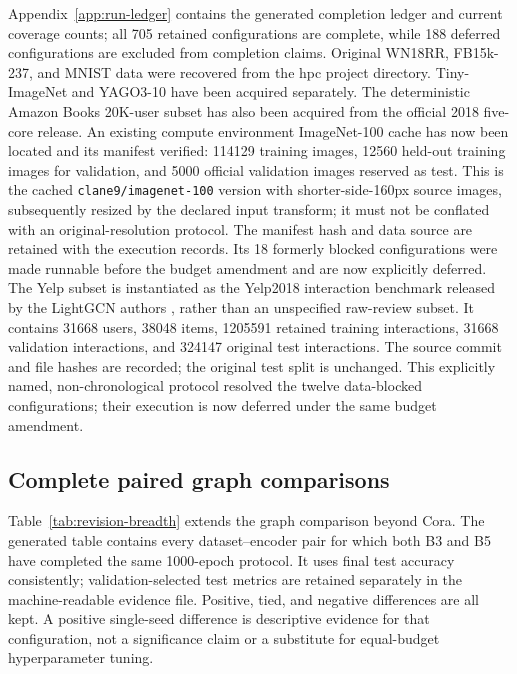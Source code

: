 Appendix~\ref{app:run-ledger} contains the generated completion ledger and current coverage counts; all 705 retained configurations are complete, while 188 deferred configurations are excluded from completion claims. Original WN18RR, FB15k-237, and MNIST data were recovered from the hpc project directory. Tiny-ImageNet and YAGO3-10 have been acquired separately. The deterministic Amazon Books 20K-user subset has also been acquired from the official 2018 five-core release. An existing compute environment ImageNet-100 cache has now been located and its manifest verified: 114129 training images, 12560 held-out training images for validation, and 5000 official validation images reserved as test. This is the cached \texttt{clane9/imagenet-100} version with shorter-side-160px source images, subsequently resized by the declared input transform; it must not be conflated with an original-resolution protocol. The manifest hash and data source are retained with the execution records. Its 18 formerly blocked configurations were made runnable before the budget amendment and are now explicitly deferred. The Yelp subset is instantiated as the Yelp2018 interaction benchmark released by the LightGCN authors \citep{he2020lightgcn}, rather than an unspecified raw-review subset. It contains 31668 users, 38048 items, 1205591 retained training interactions, 31668 validation interactions, and 324147 original test interactions. The source commit and file hashes are recorded; the original test split is unchanged. This explicitly named, non-chronological protocol resolved the twelve data-blocked configurations; their execution is now deferred under the same budget amendment.


\subsection{Complete paired graph comparisons}
Table~\ref{tab:revision-breadth} extends the graph comparison beyond Cora. The generated table contains every dataset--encoder pair for which both B3 and B5 have completed the same 1000-epoch protocol. It uses final test accuracy consistently; validation-selected test metrics are retained separately in the machine-readable evidence file. Positive, tied, and negative differences are all kept. A positive single-seed difference is descriptive evidence for that configuration, not a significance claim or a substitute for equal-budget hyperparameter tuning.



